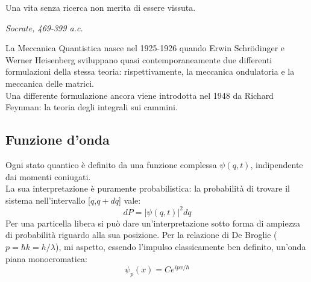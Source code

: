 \documentclass[twoside]{article}
\begin{document}
\vspace{12mm}
\epigraph{Una vita senza ricerca non merita di essere vissuta.}{\textit{Socrate, 469-399 a.c.}}
\vspace{12mm}

La Meccanica Quantistica nasce nel 1925-1926 quando Erwin Schr\"odinger e Werner Heisenberg sviluppano quasi contemporaneamente due differenti formulazioni della stessa teoria: rispettivamente, la meccanica ondulatoria e la meccanica delle matrici.
\\
Una differente formulazione ancora viene introdotta nel 1948 da Richard Feynman: la teoria degli integrali sui cammini.
\\
\subsection{Funzione d'onda}
Ogni stato quantico è definito da una funzione complessa $\psi(q,t)$, indipendente dai momenti coniugati.\\
La sua interpretazione è puramente probabilistica: la probabilità di trovare il sistema nell'intervallo [$q$,$q+dq$] vale:
\begin{equation}
    dP=|\psi(q,t)|^2dq
\end{equation}
Per una particella libera si può dare un'interpretazione sotto forma di ampiezza di probabilità riguardo alla sua posizione. Per la relazione di De Broglie ($p=\hbar k= h / \lambda$), mi aspetto, essendo l'impulso classicamente ben definito, un'onda piana monocromatica: 
\begin{equation}
    \psi_p (x) = Ce^{ipx/\hbar}
\end{equation}
\end{document}
